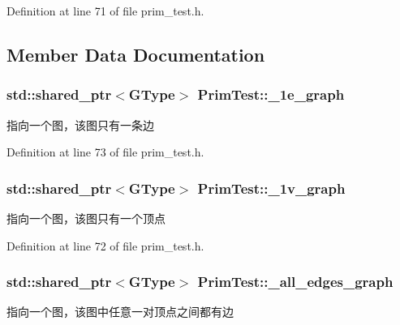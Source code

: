 Definition at line 71 of file prim\+\_\+test.\+h.



\subsection{Member Data Documentation}
\hypertarget{class_prim_test_a256859b15df61e1cd0c96065bf19dc71}{}
\subsubsection[{\+\_\+1e\+\_\+graph}]{\setlength{\rightskip}{0pt plus 5cm}std\+::shared\+\_\+ptr$<${\bf G\+Type}$>$ Prim\+Test\+::\+\_\+1e\+\_\+graph\hspace{0.3cm}{\ttfamily [protected]}}\label{class_prim_test_a256859b15df61e1cd0c96065bf19dc71}
指向一个图，该图只有一条边 

Definition at line 73 of file prim\+\_\+test.\+h.

\hypertarget{class_prim_test_a7ff7449d84167db478a33a4dbb1b2e78}{}
\subsubsection[{\+\_\+1v\+\_\+graph}]{\setlength{\rightskip}{0pt plus 5cm}std\+::shared\+\_\+ptr$<${\bf G\+Type}$>$ Prim\+Test\+::\+\_\+1v\+\_\+graph\hspace{0.3cm}{\ttfamily [protected]}}\label{class_prim_test_a7ff7449d84167db478a33a4dbb1b2e78}
指向一个图，该图只有一个顶点 

Definition at line 72 of file prim\+\_\+test.\+h.

\hypertarget{class_prim_test_a25281c926fc389770548b0f035e41615}{}
\subsubsection[{\+\_\+all\+\_\+edges\+\_\+graph}]{\setlength{\rightskip}{0pt plus 5cm}std\+::shared\+\_\+ptr$<${\bf G\+Type}$>$ Prim\+Test\+::\+\_\+all\+\_\+edges\+\_\+graph\hspace{0.3cm}{\ttfamily [protected]}}\label{class_prim_test_a25281c926fc389770548b0f035e41615}
指向一个图，该图中任意一对顶点之间都有边 

